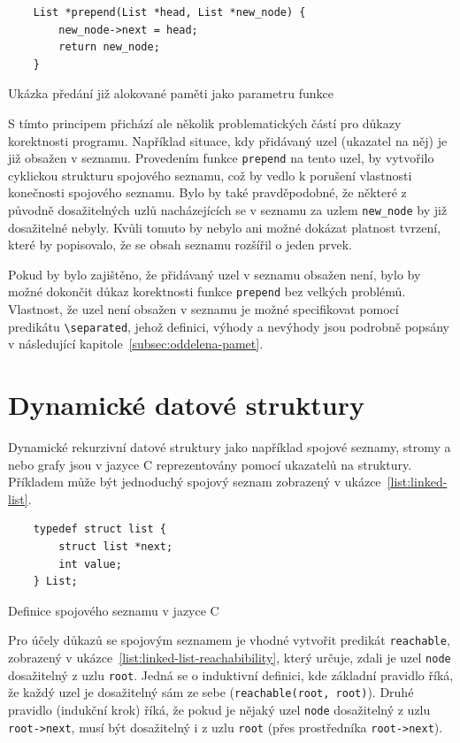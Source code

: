 \begin{listing}[H]
    \begin{verbatim}
    List *prepend(List *head, List *new_node) {
        new_node->next = head;
        return new_node;
    }
    \end{verbatim}
    \caption{Ukázka předání již alokované paměti jako parametru funkce}
    \label{list:prepend}
\end{listing}

S tímto principem přichází ale několik problematických částí pro důkazy korektnosti programu.
Například situace, kdy přidávaný uzel (ukazatel na něj) je již obsažen v seznamu.
Provedením funkce \texttt{prepend} na tento uzel,
by vytvořilo cyklickou strukturu spojového seznamu,
což by vedlo k porušení vlastnosti konečnosti spojového seznamu.
Bylo by také pravděpodobné, že některé z původně dosažitelných uzlů
nacházejících se v seznamu za uzlem \texttt{new\_node}
by již dosažitelné nebyly.
Kvůli tomuto by nebylo ani možné dokázat platnost tvrzení,
které by popisovalo, že se obsah seznamu rozšířil o jeden prvek.

Pokud by bylo zajištěno, že přidávaný uzel v seznamu obsažen není,
bylo by možné dokončit důkaz korektnosti funkce \texttt{prepend} bez velkých problémů.
Vlastnost, že uzel není obsažen v seznamu je možné specifikovat pomocí predikátu \texttt{\textbackslash separated},
jehož definici, výhody a nevýhody jsou podrobně popsány v následující kapitole~\ref{subsec:oddelena-pamet}.

\section{Dynamické datové struktury}
\label{sec:dynamicke-datove-struktury}

Dynamické rekurzivní datové struktury jako například spojové seznamy,
stromy a nebo grafy jsou v jazyce C reprezentovány pomocí ukazatelů na struktury.
Příkladem může být jednoduchý spojový seznam zobrazený v ukázce~\ref{list:linked-list}.

\begin{listing}[H]
    \begin{verbatim}
    typedef struct list {
        struct list *next;
        int value;
    } List;
    \end{verbatim}
    \caption{Definice spojového seznamu v jazyce C}
    \label{list:linked-list}
\end{listing}

Pro účely důkazů se spojovým seznamem je vhodné vytvořit predikát \texttt{reachable},
zobrazený v ukázce~\ref{list:linked-list-reachabibility},
který určuje, zdali je uzel \texttt{node} dosažitelný z uzlu \texttt{root}.
Jedná se o induktivní definici,
kde základní pravidlo říká,
že každý uzel je dosažitelný sám ze sebe (\texttt{reachable(root, root)}).
Druhé pravidlo (indukční krok) říká,
že pokud je nějaký uzel \texttt{node} dosažitelný z uzlu \texttt{root->next},
musí být dosažitelný i z uzlu \texttt{root} (přes prostředníka \texttt{root->next}).

